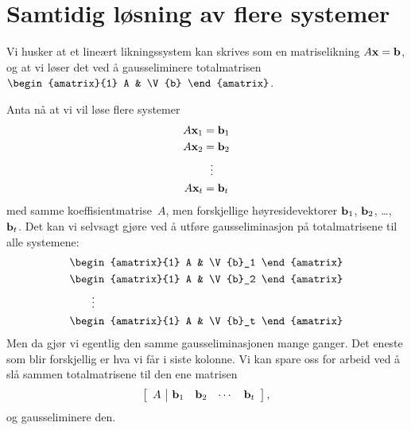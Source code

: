 \section*{Samtidig løsning av flere systemer}

Vi husker at et lineært likningssystem kan skrives som en
matriselikning $A \mathbf{x} = \mathbf{b}$, og at vi løser det ved å
gausseliminere totalmatrisen
$\begin{amatrix}{1} A & \V{b} \end{amatrix}$.

Anta nå at vi vil løse flere systemer
\begin{align*}
A \mathbf{x}_1 &= \mathbf{b}_1 \\
A \mathbf{x}_2 &= \mathbf{b}_2 \\
          &\ \ \vdots \\
A \mathbf{x}_t &= \mathbf{b}_t
\end{align*}
med samme koeffisientmatrise~$A$, men forskjellige høyresidevektorer
$\mathbf{b}_1$, $\mathbf{b}_2$, \ldots, $\mathbf{b}_t$.  Det kan vi selvsagt gjøre
ved å utføre gausseliminasjon på totalmatrisene til alle systemene:
\begin{align*}
& \begin{amatrix}{1} A & \V{b}_1 \end{amatrix} \\
& \begin{amatrix}{1} A & \V{b}_2 \end{amatrix} \\
& \qquad\vdots \\
& \begin{amatrix}{1} A & \V{b}_t \end{amatrix}
\end{align*}
Men da gjør vi egentlig den samme gausseliminasjonen mange ganger.
Det eneste som blir forskjellig er hva vi får i siste kolonne.  Vi kan
spare oss for arbeid ved å slå sammen totalmatrisene til den ene
matrisen
\[
\left[
\begin{array}{c|cccc} A & \mathbf{b}_1 & \mathbf{b}_2 & \cdots & \mathbf{b}_t \end{array}
\right],
\]
og gausseliminere den.

